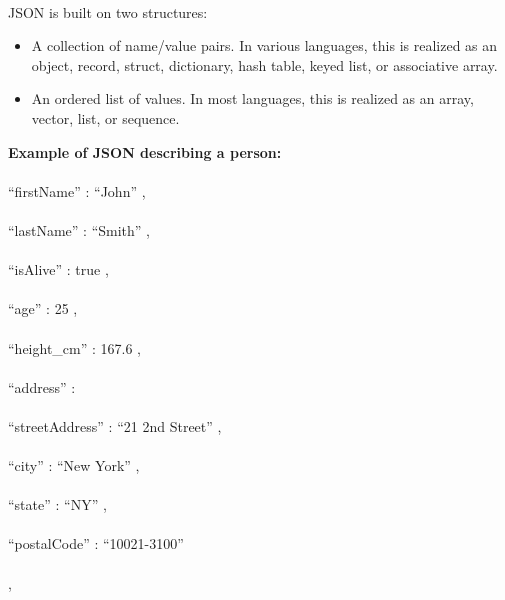 \documentclass[12pt,a4paper]{article}
\begin{document}
\begin{enumerate}
\\
\hspace{0.7 cm}JSON is built on two structures:
\\
\begin{itemize}
\item	A collection of name/value pairs. In various languages, this is realized as an object, record, struct, dictionary, hash table, keyed list, or associative array.

\item	An ordered list of values. In most languages, this is realized as an array, vector, list, or sequence.
\end{itemize}

\textbf{Example of JSON describing a person:}
\\
\hspace{0.7 cm}	{\\
\hspace{0.7 cm}		 “firstName” : “John” ,\\
\\
\hspace{0.7 cm}	     	 “lastName” : “Smith” ,\\
\\
\hspace{0.7 cm}	      	 “isAlive” : true ,\\
\\
\hspace{0.7 cm}	      	 “age” : 25 ,\\
\\
\hspace{0.7 cm}		“height_cm” : 167.6 ,\\
\\
\hspace{0.7 cm}		“address” : {\\
\\
\hspace{0.7 cm}			“streetAddress” : “21 2nd Street” ,\\
\\
\hspace{0.7 cm}			“city” :  “New York” ,\\
\\
\hspace{0.7 cm}			“state” : “NY” ,\\
\\
\hspace{0.7 cm}			“postalCode” : “10021-3100”\\
\\
\hspace{0.7 cm}			      } ,\\
}
\end{enumerate}
\end{document}
